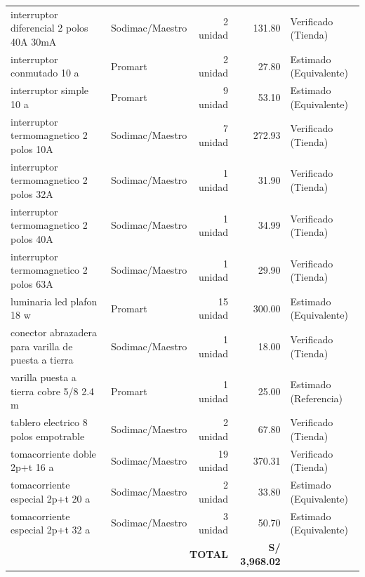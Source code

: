 \begin{longtable}{p{5.5cm}p{2.5cm}r r p{3.0cm}}
interruptor diferencial 2 polos 40A 30mA & Sodimac/Maestro & 2 unidad & 131.80 & Verificado (Tienda) \\
interruptor conmutado 10 a & Promart & 2 unidad & 27.80 & Estimado (Equivalente) \\
interruptor simple 10 a & Promart & 9 unidad & 53.10 & Estimado (Equivalente) \\
interruptor termomagnetico 2 polos 10A & Sodimac/Maestro & 7 unidad & 272.93 & Verificado (Tienda) \\
interruptor termomagnetico 2 polos 32A & Sodimac/Maestro & 1 unidad & 31.90 & Verificado (Tienda) \\
interruptor termomagnetico 2 polos 40A & Sodimac/Maestro & 1 unidad & 34.99 & Verificado (Tienda) \\
interruptor termomagnetico 2 polos 63A & Sodimac/Maestro & 1 unidad & 29.90 & Verificado (Tienda) \\
luminaria led plafon 18 w & Promart & 15 unidad & 300.00 & Estimado (Equivalente) \\
conector abrazadera para varilla de puesta a tierra & Sodimac/Maestro & 1 unidad & 18.00 & Verificado (Tienda) \\
varilla puesta a tierra cobre 5/8 2.4 m & Promart & 1 unidad & 25.00 & Estimado (Referencia) \\
tablero electrico 8 polos empotrable & Sodimac/Maestro & 2 unidad & 67.80 & Verificado (Tienda) \\
tomacorriente doble 2p+t 16 a & Sodimac/Maestro & 19 unidad & 370.31 & Verificado (Tienda) \\
tomacorriente especial 2p+t 20 a & Sodimac/Maestro & 2 unidad & 33.80 & Estimado (Equivalente) \\
tomacorriente especial 2p+t 32 a & Sodimac/Maestro & 3 unidad & 50.70 & Estimado (Equivalente) \\

\midrule\multicolumn{3}{r}{\textbf{TOTAL}} & \textbf{S/ 3,968.02} & \\ \bottomrule\end{longtable}\normalsize
